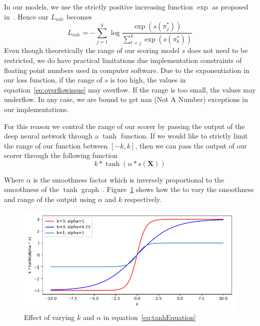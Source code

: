 \documentclass[12pt, twoside, ngerman]{report}
\begin{document}
In our models,  we use the strictly positive increasing function $\exp$ as proposed in~\cite{listmlepaper}.
Hence our $L_{mle}$ becomes 
\begin{equation}\label{eq:overflowissue}
L_{mle} = -  \sum\limits_{j=1}^{k} \log \frac{\exp(s(\pi^*_j))}{ \sum\limits_{t=j}^k \exp(s(\pi^*_k))}
\end{equation}
Even though theoretically the range of our scoring model $s$ does not need to be restricted,  we do have practical limitations due implementation constraints of floating point numbers used in computer software.
Due to the exponentiation in our loss function,  if the range of $s$ is too high,  the values in equation~\ref{eq:overflowissue} may overflow.
If the range is too small,  the values may underflow.
In any case,  we are bound to get nan (Not A Number) exceptions in our implementations.

For this reason we control the range of our scorer by passing the output of the deep neural network through a $\tanh$ function.
If we would like to strictly limit the range of our function between $[-k,  k]$,  then we can pass the output of our scorer through the following function
\begin{equation}\label{eq:tanhEquation}
k * \tanh(\alpha * s(\textbf{X}))
\end{equation}

Where $\alpha$ is the smoothness factor which is inversely proportional to the smoothness of the $\tanh$ graph~\cite{tanhstackoverflowanswer}.
Figure~\ref{fig:tanhGraph} shows how the to vary the smoothness and range of the output using $\alpha$ and $k$ respectively.

\begin{figure}[htb]
  \centering
    \includegraphics[scale=0.5]{images/tanhGraph}
    \caption{Effect of varying $k$ and $\alpha$ in equation~\ref{eq:tanhEquation}}
    \label{fig:tanhGraph}
\end{figure}
\end{document}

